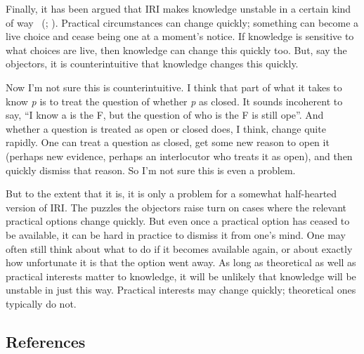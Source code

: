 \documentclass[
  10pt,
  letterpaper,
  DIV=11,
  numbers=noendperiod,
  twoside]{scrartcl}
\begin{document}
Finally, it has been argued that IRI makes knowledge unstable in a
certain kind of way ~(;
). Practical circumstances can
change quickly; something can become a live choice and cease being one
at a moment's notice. If knowledge is sensitive to what choices are
live, then knowledge can change this quickly too. But, say the
objectors, it is counterintuitive that knowledge changes this quickly.

Now I'm not sure this is counterintuitive. I think that part of what it
takes to know \emph{p} is to treat the question of whether \emph{p} as
closed. It sounds incoherent to say, ``I know a is the F, but the
question of who is the F is still ope''. And whether a question is
treated as open or closed does, I think, change quite rapidly. One can
treat a question as closed, get some new reason to open it (perhaps new
evidence, perhaps an interlocutor who treats it as open), and then
quickly dismiss that reason. So I'm not sure this is even a problem.

But to the extent that it is, it is only a problem for a somewhat
half-hearted version of IRI. The puzzles the objectors raise turn on
cases where the relevant practical options change quickly. But even once
a practical option has ceased to be available, it can be hard in
practice to dismiss it from one's mind. One may often still think about
what to do if it becomes available again, or about exactly how
unfortunate it is that the option went away. As long as theoretical as
well as practical interests matter to knowledge, it will be unlikely
that knowledge will be unstable in just this way. Practical interests
may change quickly; theoretical ones typically do not.

\subsection*{References}\label{references}
\end{document}
